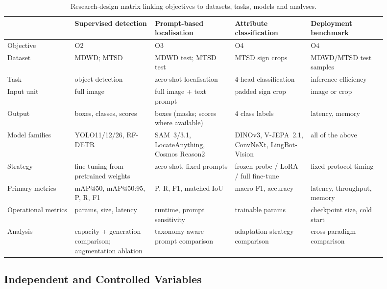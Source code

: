 \begin{table}[htbp]
\centering
\caption{Research-design matrix linking objectives to datasets, tasks, models and analyses.}
\label{tab:research-design}
\small
\begin{tabular}{p{0.16\linewidth}p{0.19\linewidth}p{0.19\linewidth}p{0.18\linewidth}p{0.18\linewidth}}
\hline
 & \textbf{Supervised detection} & \textbf{Prompt-based localisation} & \textbf{Attribute classification} & \textbf{Deployment benchmark} \\
\hline
Objective & O2 & O3 & O4 & O4 \\
Dataset & MDWD; MTSD & MDWD test; MTSD test & MTSD sign crops & MDWD/MTSD test samples \\
Task & object detection & zero-shot localisation & 4-head classification & inference efficiency \\
Input unit & full image & full image + text prompt & padded sign crop & image or crop \\
Output & boxes, classes, scores & boxes (masks; scores where available) & 4 class labels & latency, memory \\
Model families & YOLO11/12/26, RF-DETR & SAM~3/3.1, LocateAnything, Cosmos Reason2 & DINOv3, V-JEPA~2.1, ConvNeXt, LingBot-Vision & all of the above \\
Strategy & fine-tuning from pretrained weights & zero-shot, fixed prompts & frozen probe / LoRA / full fine-tune & fixed-protocol timing \\
Primary metrics & mAP@50, mAP@50:95, P, R, F1 & P, R, F1, matched IoU & macro-F1, accuracy & latency, throughput, memory \\
Operational metrics & params, size, latency & runtime, prompt sensitivity & trainable params & checkpoint size, cold start \\
Analysis & capacity + generation comparison; augmentation ablation & taxonomy-aware prompt comparison & adaptation-strategy comparison & cross-paradigm comparison \\
\hline
\end{tabular}
\end{table}

\subsection{Independent and Controlled Variables}

